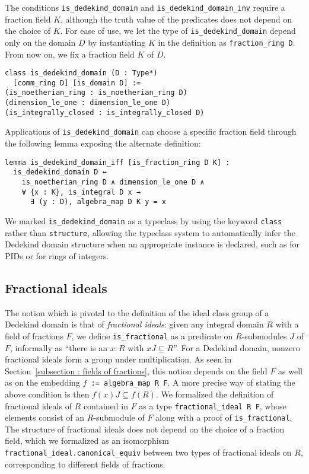 \documentclass[sn-mathphys]{sn-jnl}%
\newcommand{\lean}[1]{\texttt{#1}\xspace}
\begin{document}
The conditions \lean{is\_dedekind\_domain} and \lean{is\_dedekind\_domain\_inv} require a fraction field $K$,
although the truth value of the predicates does not depend on the choice of $K$.
For ease of use, we let the type of \lean{is\_dedekind\_domain} depend only on the domain $D$
by instantiating $K$ in the definition as \lean{fraction\-\_ring D}. From now on, we fix a fraction field $K$ of $D$.
\begin{lstlisting}
class is_dedekind_domain (D : Type*)
  [comm_ring D] [is_domain D] :=
(is_noetherian_ring : is_noetherian_ring D)
(dimension_le_one : dimension_le_one D)
(is_integrally_closed : is_integrally_closed D)
\end{lstlisting}

Applications of \lean{is\_dedekind\_domain} can choose a specific fraction field through the following lemma exposing the alternate definition:
\begin{lstlisting}
lemma is_dedekind_domain_iff [is_fraction_ring D K] :
  is_dedekind_domain D ↔
    is_noetherian_ring D ∧ dimension_le_one D ∧
    ∀ {x : K}, is_integral D x →
      ∃ (y : D), algebra_map D K y = x
\end{lstlisting}

We marked \lean{is\_dedekind\_domain} as a typeclass by using the keyword \lean{class} rather than \lean{structure},
allowing the typeclass system to automatically infer the Dedekind domain structure when an appropriate instance is declared, such as for PIDs or for rings of integers.

\subsection{Fractional ideals}\label{subsection:frac_ideals}
The notion which is pivotal to the definition of the ideal class group of a Dedekind domain is that of \emph{fractional ideals}:
given any integral domain $R$ with a field of fractions $F$,
we define \lean{is\_fractional} as a predicate on $R$-submodules $J$ of $F$, informally as ``there is an $x : R$ with $x J \subseteq R$''.
For a Dedekind domain, nonzero fractional ideals form a group under multiplication.
As seen in Section~\ref{subsection : fields of fractions}, this notion depends on the field $F$ as well as on the embedding \lean{$f$ := algebra\_map R F}.
A more precise way of stating the above condition is then
$f(x)J\subseteq f(R)$.
We formalized the definition of fractional ideals of $R$ contained in $F$ as a type \lean{fractional\_ideal R F}, whose elements consist of an $R$-submodule of $F$ along with a proof of \lean{is\_fractional}.
The structure of fractional ideals does not depend on the choice of a fraction field,
which we formalized as an isomorphism \lean{fractional\_ideal.canonical\_equiv} between two types of fractional ideals on $R$, corresponding to different fields of fractions.
\end{document}
